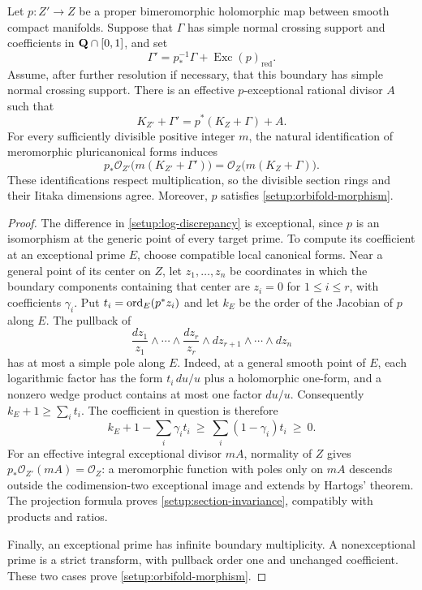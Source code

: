 \begin{lemma}\label{setup:log-modification}
Let $p:Z'\to Z$ be a proper bimeromorphic holomorphic map between smooth
compact manifolds. Suppose that $\Gamma$ has simple normal crossing
support and coefficients in $\mathbf Q\cap[0,1]$, and set
\[
 \Gamma'=p_*^{-1}\Gamma+\operatorname{Exc}(p)_{\mathrm{red}}.
\]
Assume, after further resolution if necessary, that this boundary has
simple normal crossing support. There is an effective $p$-exceptional
rational divisor $A$ such that
\begin{equation}\label{setup:log-discrepancy}
 K_{Z'}+\Gamma'=p^*(K_Z+\Gamma)+A.
\end{equation}
For every sufficiently divisible positive integer $m$, the natural
identification of meromorphic pluricanonical forms induces
\begin{equation}\label{setup:section-invariance}
 p_*\mathcal O_{Z'}\bigl(m(K_{Z'}+\Gamma')\bigr)
 =\mathcal O_Z\bigl(m(K_Z+\Gamma)\bigr).
\end{equation}
These identifications respect multiplication, so the divisible section
rings and their Iitaka dimensions agree. Moreover, $p$ satisfies
\eqref{setup:orbifold-morphism}.
\end{lemma}

\begin{proof}
The difference in \eqref{setup:log-discrepancy} is exceptional, since
$p$ is an isomorphism at the generic point of every target prime.
To compute its coefficient at an exceptional prime $E$, choose
compatible local canonical forms.
Near a general point of its center on $Z$, let $z_1,\ldots,z_n$ be
coordinates in which the boundary components containing that center are
$z_i=0$ for $1\leq i\leq r$, with coefficients $\gamma_i$.
Put $t_i=\operatorname{ord}_E(p^*z_i)$ and let $k_E$ be the order of the Jacobian of
$p$ along $E$. The pullback of
\[
 \frac{dz_1}{z_1}\wedge\cdots\wedge\frac{dz_r}{z_r}
 \wedge dz_{r+1}\wedge\cdots\wedge dz_n
\]
has at most a simple pole along $E$. Indeed, at a general smooth point of
$E$, each logarithmic factor has the form $t_i\,du/u$ plus a holomorphic
one-form, and a nonzero wedge product contains at most one factor
$du/u$. Consequently $k_E+1\geq\sum_i t_i$. The coefficient in question
is therefore
\[
 k_E+1-\sum_i\gamma_i t_i
 \ \geq\ \sum_i(1-\gamma_i)t_i\ \geq\ 0.
\]
For an effective integral exceptional divisor $mA$, normality of $Z$
gives $p_*\mathcal O_{Z'}(mA)=\mathcal O_Z$: a meromorphic function
with poles only on $mA$ descends outside the codimension-two exceptional
image and extends by Hartogs' theorem. The projection formula proves
\eqref{setup:section-invariance}, compatibly with products and ratios.

Finally, an exceptional prime has infinite boundary multiplicity.
A nonexceptional prime is a strict transform, with pullback order one
and unchanged coefficient. These two cases prove
\eqref{setup:orbifold-morphism}.
\end{proof}

